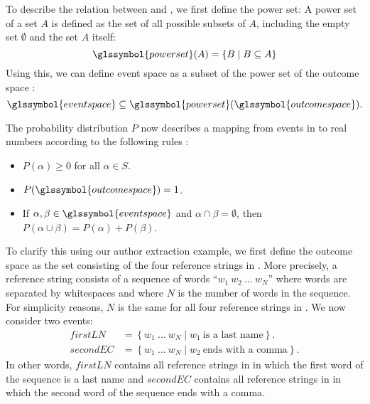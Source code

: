 To describe the relation between  and , we first define the \gls{power set}:
A \gls{power set} of a set $A$ is defined as the set of all possible subsets of $A$, including the empty set $\emptyset$ and the set $A$ itself:
\begin{equation}
  \label{equ:power-set}
  \glssymbol{power set}(A)=\left\{B\mid B\subseteq A\right\}
\end{equation}
Using this, we can define \gls{event space}  as a subset of the \gls{power set} of the \gls{outcome space} :
\begin{equation*}
  \glssymbol{event space}\subseteq\glssymbol{power set}(\glssymbol{outcome space}).
\end{equation*}

\newpage

The \gls{probability distribution} $P$ now describes a mapping from \glspl{event} in  to real numbers according to the following rules \citep{koller2009probabilistic}:
\begin{itemize}
  \item $P(\alpha)\geq 0 $ for all $ \alpha \in S$.
  \item $P(\glssymbol{outcome space})=1$.
  \item If $\alpha,\beta\in \glssymbol{event space}$ and $\alpha\cap\beta = \emptyset$, then $P(\alpha\cup\beta)=P(\alpha)+P(\beta)$.
\end{itemize}

To clarify this using our author extraction example, we first define the \gls{outcome space}  as the set consisting of the four reference strings in .
More precisely, a reference string consists of a sequence of words ``$w_1\ w_2\ \dots\ w_N$'' where words are separated by whitespaces and where $N$ is the number of words in the sequence.
For simplicity reasons, $N$ is the same for all four reference strings in .
We now consider two \glspl{event}:
\begin{equation*}
  \begin{split}
    \mathit{firstLN}&=\left\{w_1\ \dots\ w_N \mid w_1\ \text{is a last name}\right\}.\\
    \mathit{secondEC}&=\left\{w_1\ \dots\ w_N \mid w_2\ \text{ends with a comma}\right\}.
  \end{split}
\end{equation*}
In other words, $\mathit{firstLN}$ contains all reference strings in  in which the first word of the sequence is a last name and $\mathit{secondEC}$ contains all reference strings in  in which the second word of the sequence ends with a comma.

